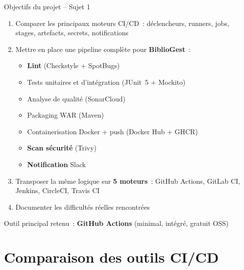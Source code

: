 \documentclass[aspectratio=169,12pt]{beamer}
\begin{document}
\begin{frame}{Objectifs du projet -- Sujet 1}
  \begin{enumerate}
    \item Comparer les principaux moteurs CI/CD~: déclencheurs, runners, jobs,
          stages, artefacts, secrets, notifications
    \item Mettre en place une pipeline complète pour \textbf{BiblioGest}~:
          \begin{itemize}
            \item \textbf{Lint} (Checkstyle + SpotBugs)
            \item Tests unitaires et d'intégration (JUnit~5 + Mockito)
            \item Analyse de qualité (SonarCloud)
            \item Packaging WAR (Maven)
            \item Containerisation Docker + push (Docker Hub + GHCR)
            \item \textbf{Scan sécurité} (Trivy)
            \item \textbf{Notification} Slack
          \end{itemize}
    \item Transposer la même logique sur \textbf{5 moteurs}~: GitHub Actions,
          GitLab CI, Jenkins, CircleCI, Travis CI
    \item Documenter les difficultés réelles rencontrées
  \end{enumerate}

  \vspace{0.4em}
  \alert{Outil principal retenu~: \textbf{GitHub Actions} (minimal, intégré, gratuit OSS)}
\end{frame}

\section{Comparaison des outils CI/CD}
\end{document}

